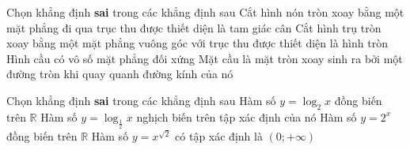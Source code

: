 \begin{ex}%
Chọn khẳng định {\bf{sai}} trong các khẳng  định sau
\choice
{Cắt hình nón tròn xoay bằng một mặt phẳng đi qua trục thu được thiết diện là tam giác cân}
	{\True Cắt hình trụ tròn xoay bằng một mặt phẳng vuông góc với trục thu được thiết diện là hình tròn}
	{Hình cầu có vô số mặt phẳng đối xứng}
	{Mặt cầu là mặt tròn xoay sinh ra bởi một đường tròn khi quay quanh đường kính của nó}
\end{ex}
\begin{ex}%
Chọn khẳng định {\bf{sai}} trong các khẳng  định sau
	\choice
	{\True Hàm số $y = \log_{2}x$ đồng biến trên $\mathbb{R}$}
	{Hàm số $y = \log_{\frac{1}{2}}x$ nghịch biến trên tập xác định của nó}
	{Hàm số $y = 2^x$ đồng biến trên $\mathbb{R}$}
	{Hàm số $y = x^{\sqrt{2}}$ có tập xác định là $\left(0; +\infty\right)$}
\end{ex}

